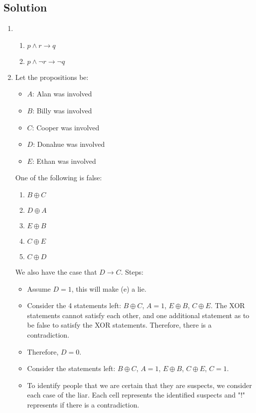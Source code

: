 \documentclass{article}
\begin{document}
\subsection*{Solution}
\begin{enumerate}[label=\alph*.]
    \item
          \begin{enumerate}[label=\roman*.]
              \item \( p \land r \to q \)
              \item \( p \land \neg r \to \neg q \)
          \end{enumerate}
    \item
          Let the propositions be:
          \begin{itemize}
              \item \( A \): Alan was involved
              \item \( B \): Billy was involved
              \item \( C \): Cooper was involved
              \item \( D \): Donahue was involved
              \item \( E \): Ethan was involved
          \end{itemize}
          One of the following is false:
          \begin{enumerate}
              \item \( B \oplus C \)
              \item \( D \oplus A \)
              \item \( E \oplus B \)
              \item \( C \oplus E \)
              \item \( C \oplus D \)
          \end{enumerate}
          We also have the case that $D \to C$. Steps:
          \begin{itemize}
              \item Assume $D=1$, this will make (e) a lie.
              \item Consider the 4 statements left: $B \oplus C$, $A=1$, $E \oplus B$, $C \oplus E$. The XOR statements cannot satisfy each other, and one additional statement as to be false to satisfy the XOR statements. Therefore, there is a contradiction.
              \item Therefore, $D=0$.
              \item Consider the statements left: $B \oplus C$, $A=1$, $E \oplus B$, $C \oplus E$, $C=1$.
              \item To identify people that we are certain that they are suspects, we consider each case of the liar. Each cell represents the identified suspects and "!" represents if there is a contradiction.

\end{itemize}
\end{enumerate}
\end{document}
